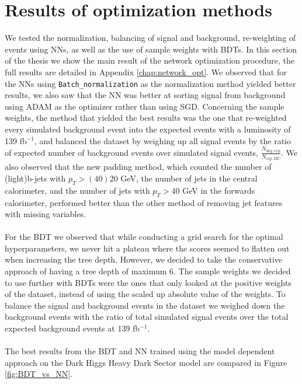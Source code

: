\documentclass[12pt, a4paper]{book}
\begin{document}
\section{Results of optimization methods}\label{sec:opt_res}
We tested the normalization, balancing of signal and background, re-weighting of events using NNs, as well as the use of sample weights with BDTs. In this section of the thesis we show the main result of the network optimization procedure, the full results are detailed in Appendix \ref{chap:network_opt}. We observed that for the NNs using \verb|Batch_normalization| as the normalization method yielded better results, 
we also saw that the NN was better at sorting signal from background using ADAM as the optimizer rather than using SGD. 
Concerning the sample weights, the method that yielded the best results was the one that re-weighted every simulated background event into the expected events with a luminosity of 139 fb$^{-1}$, and balanced the dataset by weighing up all signal events by the ratio of expected number of background events over simulated signal events, $\frac{N_{bkg,exp}}{N_{sig,MC}}$. We also observed that the new padding method, 
which counted the number of (light)b-jets with $p_T>(40)20$ GeV, the number of jets in the central calorimeter, and the number of jets with $p_T>40$ GeV in the forwards calorimeter, performed better than the other method of removing jet features with missing variables. \\
\\For the BDT we observed that while conducting a grid search for the optimal hyperparameters, we never hit a plateau where the scores seemed to flatten out when increasing the tree depth. However, we decided to take the conservative approach of having a tree depth of maximum 6. The sample weights we decided to use further with BDTs were the ones 
that only looked at the positive weights of the dataset, instead of using the scaled up absolute value of the weights. To balance the signal and background events in the dataset we weighed down the background events with the ratio of total simulated signal events over the total expected background events at 139 fb$^{-1}$.\\
\\The best results from the BDT and NN trained using the model dependent approach on the Dark Higgs Heavy Dark Sector model are compared in Figure \ref{fig:BDT_vs_NN}.
\newpage
\end{document}
